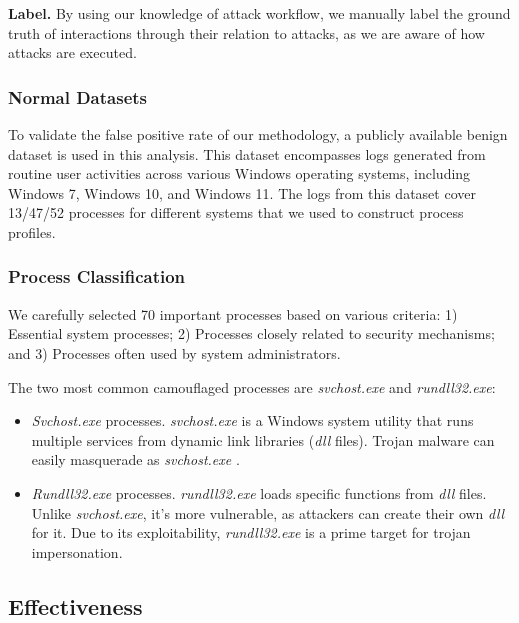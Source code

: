 \noindent
{\bf Label.}
By using our knowledge of attack workflow, we manually label the ground truth of interactions through their relation to attacks, as we are aware of how attacks are executed.


\subsubsection{Normal Datasets}
To validate the false positive rate of our methodology, a publicly available benign dataset \cite{evtx-baseline2022} is used in this analysis. This dataset encompasses logs generated from routine user activities across various Windows operating systems, including Windows 7, Windows 10, and Windows 11. The logs from this dataset cover 13/47/52 processes for different systems that we used to construct process profiles.

\subsubsection{Process Classification}
We carefully selected 70 important processes based on various criteria: 1) Essential system processes; 2) Processes closely related to security mechanisms; and 3) Processes often used by system administrators. 

The two most common camouflaged processes are \textit{svchost.exe} and \textit{rundll32.exe}:
\begin{itemize}
    \item \textit{Svchost.exe} processes. \textit{svchost.exe} is a Windows system utility that runs multiple services from dynamic link libraries (\textit{dll} files). Trojan malware can easily masquerade as \textit{svchost.exe} \cite{svchost2023}.
    \item \textit{Rundll32.exe} processes. \textit{rundll32.exe} loads specific functions from \textit{dll} files. Unlike \textit{svchost.exe}, it's more vulnerable, as attackers can create their own \textit{dll} for it. Due to its exploitability, \textit{rundll32.exe} is a prime target for trojan impersonation. 
\end{itemize}


\subsection{Effectiveness}
\label{sec-effective}

